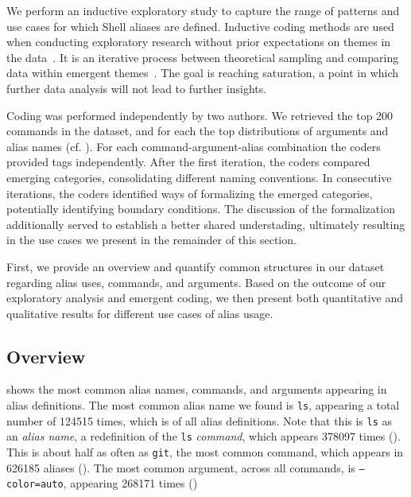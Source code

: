 We perform an inductive exploratory study to capture the range of patterns and use cases for which Shell aliases are defined. 
Inductive coding methods are used when conducting exploratory research without prior expectations on themes in the data~\cite{thomas:06}. It is an iterative process between theoretical sampling and comparing data within emergent themes~\cite{dey:03}. The goal is reaching saturation, a point in which further data analysis will not lead to further insights. 

Coding was performed independently by two authors.
We retrieved the top 200 commands in the dataset, and for each the top distributions of arguments and alias names (cf. ).
For each command-argument-alias combination the coders provided tags independently.
After the first iteration, the coders compared emerging categories, consolidating different naming conventions.
In consecutive iterations, the coders identified ways of formalizing the emerged categories, potentially identifying boundary conditions.
The discussion of the formalization additionally served to establish a better shared understading, ultimately resulting in the use cases we present in the remainder of this section.

First, we provide an overview and quantify common structures in our dataset regarding alias uses, commands, and arguments.
Based on the outcome of our exploratory analysis and emergent coding, we then present both quantitative and qualitative results for different use cases of alias usage.

\subsection{Overview}

 shows the most common alias names, commands, and arguments appearing in alias definitions.
The most common alias name we found is \texttt{ls}, appearing a total number of \num{124515} times, which is  of all alias definitions.
Note that this is \texttt{ls} as an \emph{alias name}, a redefinition of the \texttt{ls} \emph{command}, which appears \num{378097} times ().
This is about half as often as \texttt{git}, the most common command, which appears in \num{626185} aliases ().
The most common argument, across all commands, is \texttt{--color=auto}, appearing \num{268171} times ()




